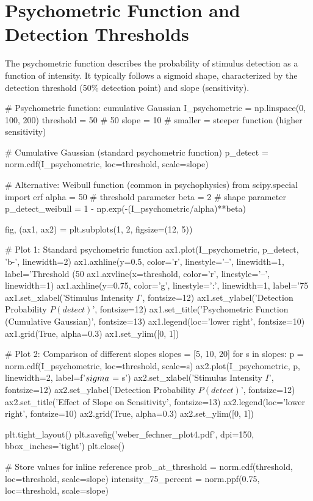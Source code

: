 \documentclass[11pt,a4paper]{article}
\begin{document}
\section{Psychometric Function and Detection Thresholds}

The psychometric function describes the probability of stimulus detection as a function of intensity. It typically follows a sigmoid shape, characterized by the detection threshold (50\% detection point) and slope (sensitivity).

\begin{pycode}
# Psychometric function: cumulative Gaussian
I_psychometric = np.linspace(0, 100, 200)
threshold = 50  # 50%
slope = 10      # smaller = steeper function (higher sensitivity)

# Cumulative Gaussian (standard psychometric function)
p_detect = norm.cdf(I_psychometric, loc=threshold, scale=slope)

# Alternative: Weibull function (common in psychophysics)
from scipy.special import erf
alpha = 50  # threshold parameter
beta = 2    # shape parameter
p_detect_weibull = 1 - np.exp(-(I_psychometric/alpha)**beta)

fig, (ax1, ax2) = plt.subplots(1, 2, figsize=(12, 5))

# Plot 1: Standard psychometric function
ax1.plot(I_psychometric, p_detect, 'b-', linewidth=2)
ax1.axhline(y=0.5, color='r', linestyle='--', linewidth=1, label='Threshold (50%
ax1.axvline(x=threshold, color='r', linestyle='--', linewidth=1)
ax1.axhline(y=0.75, color='g', linestyle=':', linewidth=1, label='75%
ax1.set_xlabel('Stimulus Intensity $I$', fontsize=12)
ax1.set_ylabel('Detection Probability $P(detect)$', fontsize=12)
ax1.set_title('Psychometric Function (Cumulative Gaussian)', fontsize=13)
ax1.legend(loc='lower right', fontsize=10)
ax1.grid(True, alpha=0.3)
ax1.set_ylim([0, 1])

# Plot 2: Comparison of different slopes
slopes = [5, 10, 20]
for s in slopes:
    p = norm.cdf(I_psychometric, loc=threshold, scale=s)
    ax2.plot(I_psychometric, p, linewidth=2, label=f'$\\sigma$ = {s}')
ax2.set_xlabel('Stimulus Intensity $I$', fontsize=12)
ax2.set_ylabel('Detection Probability $P(detect)$', fontsize=12)
ax2.set_title('Effect of Slope on Sensitivity', fontsize=13)
ax2.legend(loc='lower right', fontsize=10)
ax2.grid(True, alpha=0.3)
ax2.set_ylim([0, 1])

plt.tight_layout()
plt.savefig('weber_fechner_plot4.pdf', dpi=150, bbox_inches='tight')
plt.close()

# Store values for inline reference
prob_at_threshold = norm.cdf(threshold, loc=threshold, scale=slope)
intensity_75_percent = norm.ppf(0.75, loc=threshold, scale=slope)
\end{pycode}
\end{document}
